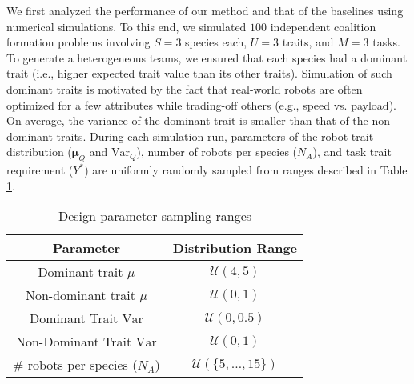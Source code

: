 \documentclass[letterpaper, 10 pt, conference]{ieeeconf}  %
\begin{document}
We first analyzed the performance of our method and that of the baselines using numerical simulations. To this end, we simulated $100$ independent coalition formation problems involving $S=3$ species each, $U=3$ traits, and $M=3$ tasks. To generate a heterogeneous teams, we ensured that each species had a dominant trait (i.e., higher expected trait value than its other traits). Simulation of such dominant traits is motivated by the fact that real-world robots are often optimized for a few attributes while trading-off others (e.g., speed vs. payload). On average, the variance of the dominant trait is smaller than that of the non-dominant traits. 
During each simulation run, parameters of the robot trait distribution ($\bm{\mu}_Q$ and $\bm{\mathrm{Var}}_Q$), number of robots per species ($N_A$), and task trait requirement ($Y^*$) are uniformly randomly sampled from ranges described in Table \ref{tab:trait_table}. 

\begin{table}[ht]
    \centering
    \begin{tabular}{|c|c|}
        \hline
        Parameter & Distribution Range \\
        \hline
        Dominant trait $\mu$ & $\mathcal{U}(4,5)$ \\
        Non-dominant trait $\mu$ & $\mathcal{U}(0,1)$ \\
        Dominant Trait $\mathrm{Var}$ & $\mathcal{U}(0,0.5)$ \\
        Non-Dominant Trait $\mathrm{Var}$  & $\mathcal{U}(0,1)$ \\ 
        \# robots per species ($N_A$)  & $\mathcal{U}(\{5,\dots,15\})$ \\
        \hline
    \end{tabular}
    \caption{Design parameter sampling ranges}
    \label{tab:trait_table}
\end{table}
\end{document}
